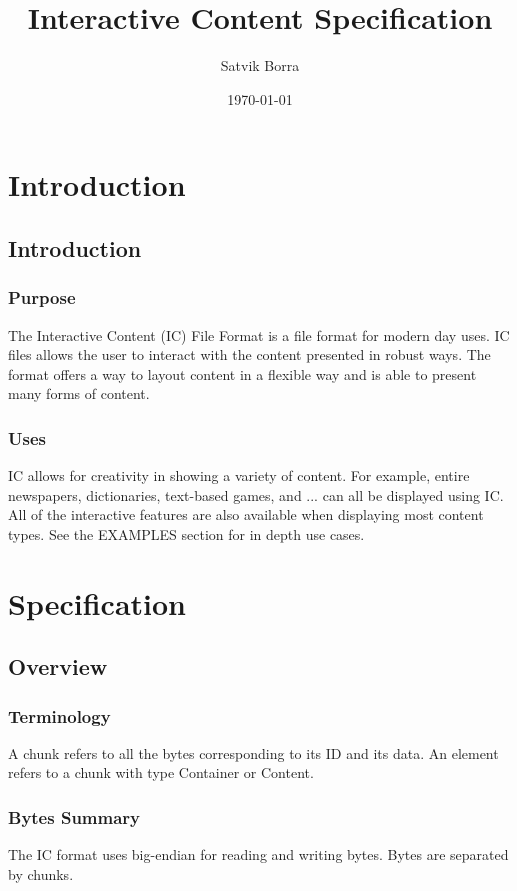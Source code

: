 \documentclass{report}
\title{Interactive Content Specification}
\author{Satvik Borra}
\date{\today}
\begin{document}
\maketitle

\tableofcontents

\part{Introduction}

\chapter{Introduction}

\section{Purpose}
The Interactive Content (IC) File Format is a file format for modern day uses. 
IC files allows the user to interact with the content presented in robust ways.
The format offers a way to layout content in a flexible way and is able to present many forms of content.

\section{Uses}
IC allows for creativity in showing a variety of content. For example, entire newspapers, dictionaries, text-based games, and ... can all be displayed using IC. All of the interactive features are also available when displaying most content types. See the EXAMPLES section for in depth use cases.

\part{Specification}

\chapter{Overview}
\section{Terminology}
A chunk refers to all the bytes corresponding to its ID and its data.
An element refers to a chunk with type Container or Content.

\section{Bytes Summary}
The IC format uses big-endian for reading and writing bytes. Bytes are separated by chunks.
\end{document}
